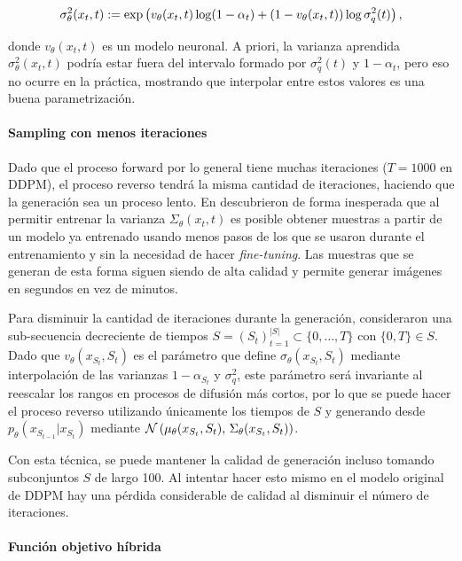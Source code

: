 \begin{equation*}
    \sigma^2_\theta(x_t,t):= \exp\left(v_\theta(x_t,t)\log (1-\alpha_t) + (1-v_\theta(x_t,t))\log \sigma^2_q(t)\right),
\end{equation*}

donde $v_\theta(x_t,t)$ es un modelo neuronal. A priori, la varianza aprendida $\sigma^2_\theta(x_t,t)$ podría estar fuera del intervalo formado por $\sigma_q^2(t)$ y $1-\alpha_t$, pero eso no ocurre en la práctica, mostrando que interpolar entre estos valores es una buena parametrización.

\paragraph{Sampling con menos iteraciones}

Dado que el proceso forward por lo general tiene muchas iteraciones ($T=1000$ en DDPM), el proceso reverso tendrá la misma cantidad de iteraciones, haciendo que la generación sea un proceso lento. En \cite{nichol2021improved} descubrieron de forma inesperada que al permitir entrenar la varianza $\Sigma_\theta(x_t,t)$ es posible obtener muestras a partir de un modelo ya entrenado usando menos pasos de los que se usaron durante el entrenamiento y sin la necesidad de hacer \textit{fine-tuning}. Las muestras que se generan de esta forma siguen siendo de alta calidad y permite generar imágenes en segundos en vez de minutos.

Para disminuir la cantidad de iteraciones durante la generación, consideraron una sub-secuencia decreciente de tiempos $S=(S_t)_{t=1}^{|S|}\subset\{0,\ldots,T\}$ con $\{0,T\}\in S$. Dado que $v_\theta(x_{S_t},S_t)$ es el parámetro que define $\sigma_\theta(x_{S_t},S_t)$ mediante interpolación de las varianzas $1-\alpha_{S_t}$ y $\sigma_q^2$, este parámetro será invariante al reescalar los rangos en procesos de difusión más cortos, por lo que se puede hacer el proceso reverso utilizando únicamente los tiempos de $S$ y generando desde $p_\theta(x_{S_{t-1}}|x_{S_t})$ mediante $\mathcal{N}\left(\mu_\theta(x_{S_t}, S_t),\,\Sigma_\theta(x_{S_t}, S_t)\right)$.

Con esta técnica, se puede mantener la calidad de generación incluso tomando subconjuntos $S$ de largo 100. Al intentar hacer esto mismo en el modelo original de DDPM hay una pérdida considerable de calidad al disminuir el número de iteraciones.

\paragraph{Función objetivo híbrida}

